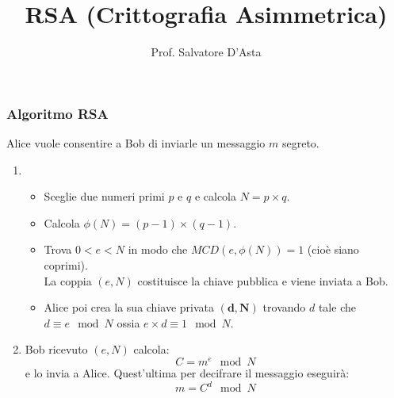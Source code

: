 \documentclass{beamer}
\title{RSA (Crittografia Asimmetrica)}
\author{Prof. Salvatore D'Asta}
\begin{document}
\begin{frame}
\maketitle
\end{frame}

\begin{frame}
\frametitle{Algoritmo RSA}
Alice vuole consentire a Bob di inviarle un messaggio $ m $ segreto.
\begin{enumerate}
	\item 
	\begin{itemize}
		\item Sceglie due numeri primi $ p $ e $ q $ e calcola $ N=p\times q $.
		\item Calcola $ \phi(N)=(p-1)\times (q-1) $. 
		\item Trova $ 0<e<N $ in modo che $ MCD(e,\phi(N))=1 $ (cioè siano coprimi).\\ La coppia $ (e,N) $ costituisce la chiave pubblica e viene inviata a Bob.
		\item Alice poi crea la sua chiave privata $ \mathbf{(d,N)} $ trovando $ d $ tale che $ d \equiv e \mod N $ ossia $ \boxed{e\times d\equiv 1 \mod N } $.
	\end{itemize}
	\item Bob ricevuto $ (e,N) $ calcola: \[ C=m^e \mod N \] e lo invia a Alice. Quest'ultima per decifrare il messaggio eseguirà:\[ m=C^d \mod N \]
\end{enumerate}
\end{frame}
\end{document}
